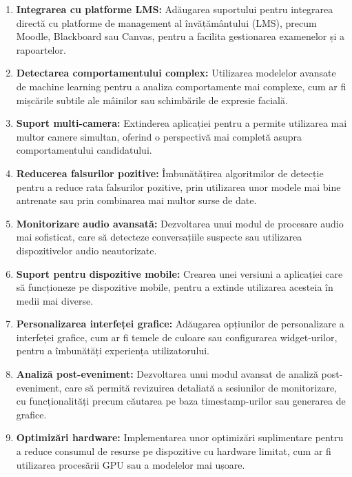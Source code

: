 \documentclass[12pt,a4paper]{article}
\begin{document}
\begin{enumerate}
    \item \textbf{Integrarea cu platforme LMS:} Adăugarea suportului pentru integrarea directă cu platforme de management al învățământului (LMS), precum Moodle, Blackboard sau Canvas, pentru a facilita gestionarea examenelor și a rapoartelor.

    \item \textbf{Detectarea comportamentului complex:} Utilizarea modelelor avansate de machine learning pentru a analiza comportamente mai complexe, cum ar fi mișcările subtile ale mâinilor sau schimbările de expresie facială.

    \item \textbf{Suport multi-camera:} Extinderea aplicației pentru a permite utilizarea mai multor camere simultan, oferind o perspectivă mai completă asupra comportamentului candidatului.

    \item \textbf{Reducerea falsurilor pozitive:} Îmbunătățirea algoritmilor de detecție pentru a reduce rata falsurilor pozitive, prin utilizarea unor modele mai bine antrenate sau prin combinarea mai multor surse de date.

    \item \textbf{Monitorizare audio avansată:} Dezvoltarea unui modul de procesare audio mai sofisticat, care să detecteze conversațiile suspecte sau utilizarea dispozitivelor audio neautorizate.

    \item \textbf{Suport pentru dispozitive mobile:} Crearea unei versiuni a aplicației care să funcționeze pe dispozitive mobile, pentru a extinde utilizarea acesteia în medii mai diverse.

    \item \textbf{Personalizarea interfeței grafice:} Adăugarea opțiunilor de personalizare a interfeței grafice, cum ar fi temele de culoare sau configurarea widget-urilor, pentru a îmbunătăți experiența utilizatorului.

    \item \textbf{Analiză post-eveniment:} Dezvoltarea unui modul avansat de analiză post-eveniment, care să permită revizuirea detaliată a sesiunilor de monitorizare, cu funcționalități precum căutarea pe baza timestamp-urilor sau generarea de grafice.

    \item \textbf{Optimizări hardware:} Implementarea unor optimizări suplimentare pentru a reduce consumul de resurse pe dispozitive cu hardware limitat, cum ar fi utilizarea procesării GPU sau a modelelor mai ușoare.
\end{enumerate}
\end{document}
